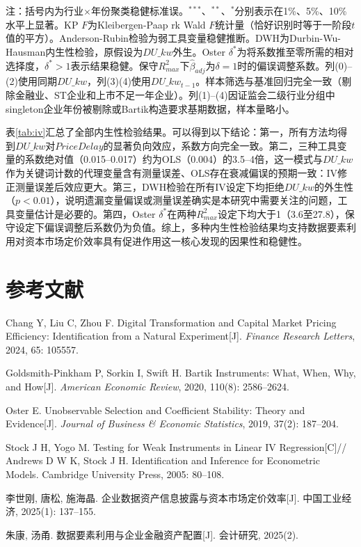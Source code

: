 \documentclass[11pt,a4paper]{article}
\begin{document}
\begin{table}[htbp]
\vspace{6pt}
{\small 注：括号内为行业$\times$年份聚类稳健标准误。$^{***}$、$^{**}$、$^{*}$分别表示在1\%、5\%、10\%水平上显著。KP $F$为Kleibergen-Paap rk Wald $F$统计量（恰好识别时等于一阶段$t$值的平方）。Anderson-Rubin检验为弱工具变量稳健推断。DWH为Durbin-Wu-Hausman内生性检验，原假设为$DU\_kw$外生。Oster $\delta^*$为将系数推至零所需的相对选择度，$\delta^*>1$表示结果稳健。保守$R^2_{max}$下$\hat{\beta}_{adj}$为$\delta=1$时的偏误调整系数。列(0)--(2)使用同期$DU\_kw$，列(3)(4)使用$DU\_kw_{t-1}$。样本筛选与基准回归完全一致（剔除金融业、ST企业和上市不足一年企业）。列(1)--(4)因证监会二级行业分组中singleton企业年份被剔除或Bartik构造要求基期数据，样本量略小。}
\end{table}

表\ref{tab:iv}汇总了全部内生性检验结果。可以得到以下结论：第一，所有方法均得到$DU\_kw$对$PriceDelay$的显著负向效应，系数方向完全一致。第二，三种工具变量的系数绝对值（0.015--0.017）约为OLS（0.004）的3.5--4倍，这一模式与$DU\_kw$作为关键词计数的代理变量含有测量误差、OLS存在衰减偏误的预期一致：IV修正测量误差后效应更大。第三，DWH检验在所有IV设定下均拒绝$DU\_kw$的外生性（$p<0.01$），说明遗漏变量偏误或测量误差确实是本研究中需要关注的问题，工具变量估计是必要的。第四，Oster $\delta^*$在两种$R^2_{max}$设定下均大于1（3.6至27.8），保守设定下偏误调整后系数仍为负值。综上，多种内生性检验结果均支持数据要素利用对资本市场定价效率具有促进作用这一核心发现的因果性和稳健性。

\section*{参考文献}

\begin{enumerate}[label={[\arabic*]}, leftmargin=2em, itemsep=3pt]

\item Chang Y, Liu C, Zhou F. Digital Transformation and Capital Market Pricing Efficiency: Identification from a Natural Experiment[J]. \textit{Finance Research Letters}, 2024, 65: 105557.

\item Goldsmith-Pinkham P, Sorkin I, Swift H. Bartik Instruments: What, When, Why, and How[J]. \textit{American Economic Review}, 2020, 110(8): 2586--2624.

\item Oster E. Unobservable Selection and Coefficient Stability: Theory and Evidence[J]. \textit{Journal of Business \& Economic Statistics}, 2019, 37(2): 187--204.

\item Stock J H, Yogo M. Testing for Weak Instruments in Linear IV Regression[C]// Andrews D W K, Stock J H. Identification and Inference for Econometric Models. Cambridge University Press, 2005: 80--108.

\item 李世刚, 唐松, 施海晶. 企业数据资产信息披露与资本市场定价效率[J]. 中国工业经济, 2025(1): 137--155.

\item 朱康, 汤甬. 数据要素利用与企业金融资产配置[J]. 会计研究, 2025(2).

\end{enumerate}
\end{document}

